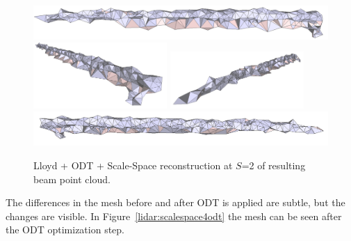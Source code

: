 \documentclass[12pt]{drexelthesis}
\begin{document}
\begin{figure}[!ht]
	\centering
		\includegraphics[width=5in]{real-lab-scans/optimizedNeat/scalespace2odt00.png}
		\includegraphics[width=2in]{real-lab-scans/optimizedNeat/scalespace2odt01.png}
		\includegraphics[width=2in]{real-lab-scans/optimizedNeat/scalespace2odt02.png}
		\includegraphics[width=5in]{real-lab-scans/optimizedNeat/scalespace2odt03.png}
		\caption[Lloyd + ODT +Scale-Space reconstruction at $S$=2 of segmented LiDAR data]{\centering Lloyd + ODT + Scale-Space reconstruction at $S$=2 of resulting beam point cloud.}
	\label{lidar:scalespace2odt}
\end{figure}

The differences in the mesh before and after ODT is applied are subtle, but the changes are visible. In Figure~\ref{lidar:scalespace4odt} the mesh can be seen after the ODT optimization step.
\end{document}
